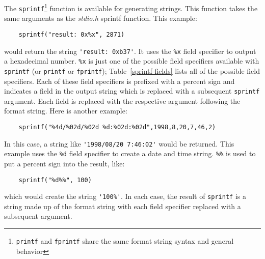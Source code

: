 The {\tt sprintf}\footnote{{\tt printf} and {\tt fprintf} share the same format
string syntax and general behavior} function is available for generating strings.
This function takes the same arguments as the {\em stdio.h} sprintf function.
This example:
\begin{verbatim}
    sprintf("result: 0x%x", 2871)
\end{verbatim}
would return the string \verb+'result: 0xb37'+. It uses the \verb+%x+ field
specifier to output a hexadecimal number. \verb+%x+ is just one of the
possible field specifiers available with {\tt sprintf} (or {\tt printf} or
{\tt fprintf}); Table~\ref{sprintf-fields} lists all of the possible field
specifiers. Each of these field specifiers is prefixed with a percent sign and
indicates a field in the output string which is replaced with a subsequent
{\tt sprintf} argument. Each field is replaced with the respective argument following
the format string. Here is another example:
\begin{verbatim}
    sprintf("%4d/%02d/%02d %d:%02d:%02d",1998,8,20,7,46,2)
\end{verbatim}
In this case, a string like \verb+'1998/08/20 7:46:02'+ would be returned.
This example uses the \verb+%d+ field specifier to create a date and time
string. \verb+%%+ is used to put a percent sign into the result, like:
\begin{verbatim}
    sprintf("%d%%", 100)
\end{verbatim}
which would create the string \verb+'100%'+. In each case, the result of
{\tt sprintf} is a string made up of the format string with each field
specifier replaced with a subsequent argument.
